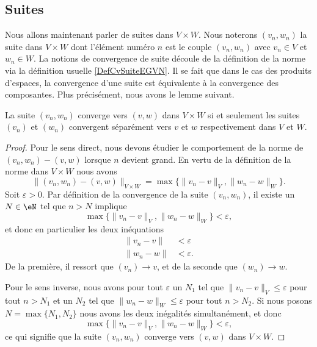 \subsection{Suites}

Nous allons maintenant parler de suites dans $V\times W$. Nous noterons $(v_n,w_n)$ la suite dans $V\times W$ dont l'élément numéro $n$ est le couple $(v_n,w_n)$ avec $v_n\in V$ et $w_n\in W$. La notions de convergence de suite découle de la définition de la norme via la définition usuelle \ref{DefCvSuiteEGVN}. Il se fait que dans le cas des produits d'espaces, la convergence d'une suite est équivalente à la convergence des composantes. Plus précisément, nous avons le lemme suivant.
\begin{lemma}		\label{LemCvVxWcvVW}
	La suite $(v_n,w_n)$ converge vers $(v,w)$ dans $V\times W$ si et seulement les suites $(v_n)$ et $(w_n)$ convergent séparément vers $v$ et $w$ respectivement dans $V$ et $W$. 
\end{lemma}

\begin{proof}
	Pour le sens direct, nous devons étudier le comportement de la norme de $(v_n,w_n)-(v,w)$ lorsque $n$ devient grand. En vertu de la définition de la norme dans $V\times W$ nous avons
	\begin{equation}
		\Big\| (v_n,w_n)-(v,w) \Big\|_{V\times W}=\max\big\{ \| v_n-v \|_V,\| w_n-w \|_W \big\}.
	\end{equation}
	Soit $\varepsilon>0$. Par définition de la convergence de la suite $(v_n,w_n)$, il existe un $N\in\eN$ tel que $n>N$ implique
	\begin{equation}
		\max\big\{ \| v_n-v \|_V,\| w_n-w \|_W \big\}<\varepsilon,
	\end{equation}
	et donc en particulier les deux inéquations
	\begin{subequations}
		\begin{align}
			\| v_n-v \|&<\varepsilon\\
			\| w_n-w \|&<\varepsilon.
		\end{align}
	\end{subequations}
	De la première, il ressort que $(v_n)\to v$, et de la seconde que $(w_n)\to w$.

	Pour le sens inverse, nous avons pour tout $\varepsilon$ un $N_1$ tel que $\| v_n-v \|_V\leq\varepsilon$ pour tout $n>N_1$ et un $N_2$ tel que $\| w_n-w \|_W\leq\varepsilon$ pour tout $n>N_2$. Si nous posons $N=\max\{ N_1,N_2 \}$ nous avons les deux inégalités simultanément, et donc
	\begin{equation}
		\max\big\{ \| v_n-v \|_V,\| w_n-w \|_W \big\}<\varepsilon,
	\end{equation}
	ce qui signifie que la suite $(v_n,w_n)$ converge vers $(v,w)$ dans $V\times W$.
\end{proof}

